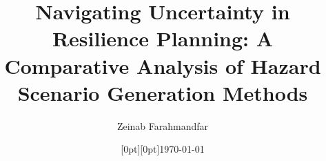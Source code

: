 {

\title[Navigating Uncertainty in Resilience Planning: A Comparative Analysis of Hazard Scenario Generation Methods]{Navigating Uncertainty in Resilience Planning: A Comparative Analysis of Hazard Scenario Generation Methods}
\subtitle{}
\author[] {Zeinab Farahmandfar}
\institute[] {}
\date[]{\raisebox{0.3cm}[0pt][0pt]{\today}}
\titlegraphic{}
\logo{}

\maketitle
}
